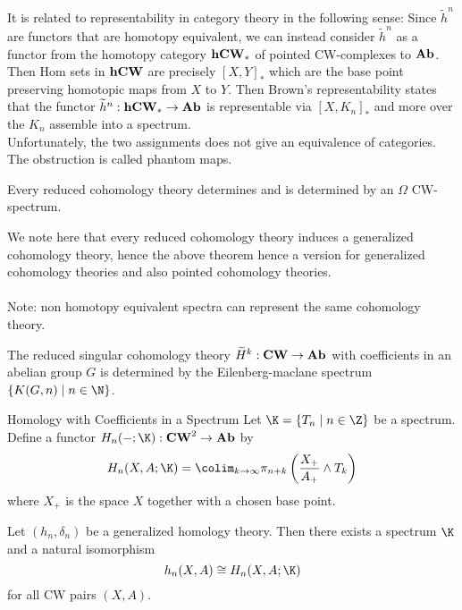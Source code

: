 \documentclass[a4paper]{article}
\begin{document}
It is related to representability in category theory in the following sense: Since $\widetilde{h}^n$ are functors that are homotopy equivalent, we can instead consider $\widetilde{h}^n$ as a functor from the homotopy category $\bold{hCW}_\ast$ of pointed CW-complexes to $\bold{Ab}$. Then Hom sets in $\bold{hCW}$ are precisely $[X,Y]_\ast$ which are the base point preserving homotopic maps from $X$ to $Y$. Then Brown's representability states that the functor $\widetilde{h}^n:\bold{hCW}_\ast\to\bold{Ab}$ is representable via $[X,K_n]_\ast$ and more over the $K_n$ assemble into a spectrum. \\

Unfortunately, the two assignments does not give an equivalence of categories. The obstruction is called phantom maps. 

\begin{thm}{}{} Every reduced cohomology theory determines and is determined by an $\Omega$ CW-spectrum. 
\end{thm}

We note here that every reduced cohomology theory induces a generalized cohomology theory, hence the above theorem hence a version for generalized cohomology theories and also pointed cohomology theories. \\~\\

Note: non homotopy equivalent spectra can represent the same cohomology theory. 

\begin{thm}{}{} The reduced singular cohomology theory $\widetilde{H}^k:\bold{CW}\to\bold{Ab}$ with coefficients in an abelian group $G$ is determined by the Eilenberg-maclane spectrum $\{K(G,n)\;|\;n\in\N\}$. 
\end{thm}

\begin{defn}{Homology with Coefficients in a Spectrum}{} Let $\K=\{T_n\;|\;n\in\Z\}$ be a spectrum. Define a functor $H_n(-;\K):\bold{CW}^2\to\bold{Ab}$ by $$H_n(X,A;\K)=\colim_{k\to\infty}\pi_{n+k}\left(\frac{X_+}{A_+}\wedge T_k\right)$$ where $X_+$ is the space $X$ together with a chosen base point. 
\end{defn}

\begin{thm}{}{} Let $(h_n,\delta_n)$ be a generalized homology theory. Then there exists a spectrum $\K$ and a natural isomorphism $$h_n(X,A)\cong H_n(X,A;\K)$$ for all CW pairs $(X,A)$. 
\end{thm}
\end{document}
